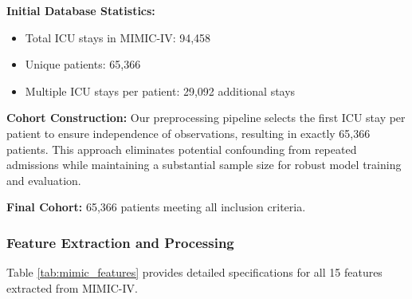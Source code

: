 \documentclass[letterpaper]{article}
\begin{document}
\textbf{Initial Database Statistics:}
\begin{itemize}
    \item Total ICU stays in MIMIC-IV: 94,458
    \item Unique patients: 65,366
    \item Multiple ICU stays per patient: 29,092 additional stays
\end{itemize}

\textbf{Cohort Construction:}
Our preprocessing pipeline selects the first ICU stay per patient to ensure independence of observations, resulting in exactly 65,366 patients. This approach eliminates potential confounding from repeated admissions while maintaining a substantial sample size for robust model training and evaluation.

\textbf{Final Cohort:} 65,366 patients meeting all inclusion criteria.

\subsubsection{Feature Extraction and Processing}

Table \ref{tab:mimic_features} provides detailed specifications for all 15 features extracted from MIMIC-IV.
\end{document}
